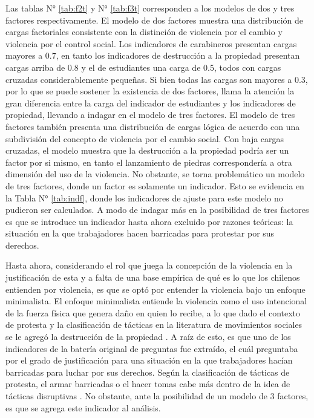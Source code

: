 \documentclass[12pt,twoside]{templates/facsothesis}
\begin{document}
Las tablas N° \ref{tab:f2t} y N° \ref{tab:f3t} corresponden a los modelos de dos y tres factores respectivamente. El modelo de dos factores muestra una distribución de cargas factoriales consistente con la distinción de violencia por el cambio y violencia por el control social. Los indicadores de carabineros presentan cargas mayores a 0.7, en tanto los indicadores de destrucción a la propiedad presentan cargas arriba de 0.8 y el de estudiantes una carga de 0.5, todos con cargas cruzadas considerablemente pequeñas. Si bien todas las cargas son mayores a 0.3, por lo que se puede sostener la existencia de dos factores, llama la atención la gran diferencia entre la carga del indicador de estudiantes y los indicadores de propiedad, llevando a indagar en el modelo de tres factores. El modelo de tres factores también presenta una distribución de cargas lógica de acuerdo con una subdivisión del concepto de violencia por el cambio social. Con baja cargas cruzadas, el modelo muestra que la destrucción a la propiedad podría ser un factor por si mismo, en tanto el lanzamiento de piedras correspondería a otra dimensión del uso de la violencia. No obstante, se torna problemático un modelo de tres factores, donde un factor es solamente un indicador. Esto se evidencia en la Tabla N° \ref{tab:indf}, donde los indicadores de ajuste para este modelo no pudieron ser calculados. A modo de indagar más en la posibilidad de tres factores es que se introduce un indicador hasta ahora excluido por razones teóricas: la situación en la que trabajadores hacen barricadas para protestar por sus derechos.

Hasta ahora, considerando el rol que juega la concepción de la violencia en la justificación de esta \citep{Blumenthal1972} y a falta de una base empírica de qué es lo que los chilenos entienden por violencia, es que se optó por entender la violencia bajo un enfoque minimalista. El enfoque minimalista entiende la violencia como el uso intencional de la fuerza física que genera daño en quien lo recibe, a lo que dado el contexto de protesta y la clasificación de tácticas en la literatura de movimientos sociales se le agregó la destrucción de la propiedad \citep{Medel2016}. A raíz de esto, es que uno de los indicadores de la batería original de preguntas fue extraído, el cuál preguntaba por el grado de justificación para una situación en la que trabajadores hacían barricadas para luchar por sus derechos. Según la clasificación de tácticas de protesta, el armar barricadas o el hacer tomas cabe más dentro de la idea de tácticas disruptivas \citep{Medel2016}. No obstante, ante la posibilidad de un modelo de 3 factores, es que se agrega este indicador al análisis.
\end{document}
